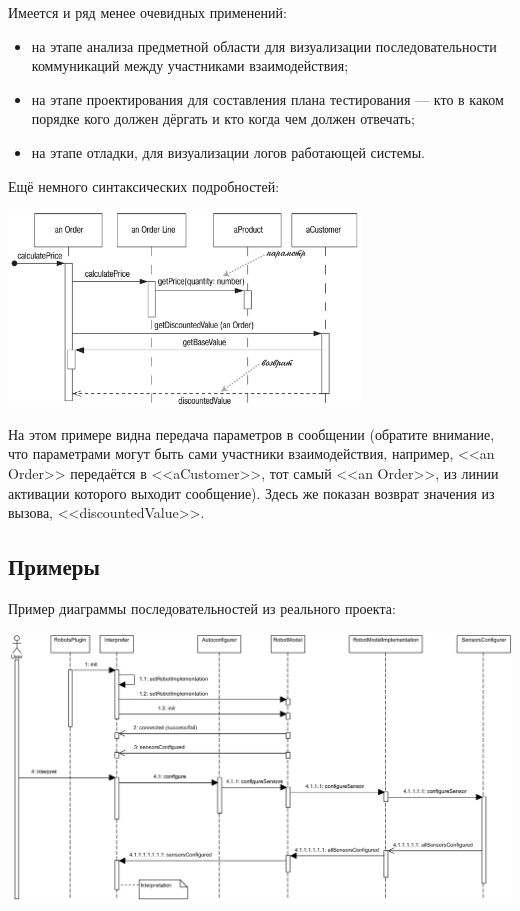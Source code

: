 \documentclass{../mcstext}
\begin{document}
Имеется и ряд менее очевидных применений: 

\begin{itemize}
    \item на этапе анализа предметной области для визуализации последовательности коммуникаций между участниками взаимодействия;
    \item на этапе проектирования для составления плана тестирования --- кто в каком порядке кого должен дёргать и кто когда чем должен отвечать;
    \item на этапе отладки, для визуализации логов работающей системы.
\end{itemize}

Ещё немного синтаксических подробностей:

\begin{center}
    \includegraphics[width=0.7\textwidth]{sequenceDiagramSyntax2.png}
\end{center}

На этом примере видна передача параметров в сообщении (обратите внимание, что параметрами могут быть сами участники взаимодействия, например, <<an Order>> передаётся в <<aCustomer>>, тот самый <<an Order>>, из линии активации которого выходит сообщение). Здесь же показан возврат значения из вызова, <<discountedValue>>.

\subsection{Примеры}

Пример диаграммы последовательностей из реального проекта:

\begin{center}
    \includegraphics[width=\textwidth]{sequenceDiagramExample.png}
\end{center}
\end{document}
